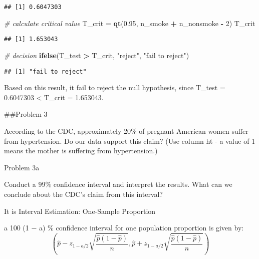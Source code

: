 \documentclass[
]{article}
\newenvironment{Shaded}{\begin{snugshade}}{\end{snugshade}}
\newcommand{\CommentTok}[1]{\textcolor[rgb]{0.56,0.35,0.01}{\textit{#1}}}
\newcommand{\DecValTok}[1]{\textcolor[rgb]{0.00,0.00,0.81}{#1}}
\newcommand{\FloatTok}[1]{\textcolor[rgb]{0.00,0.00,0.81}{#1}}
\newcommand{\FunctionTok}[1]{\textcolor[rgb]{0.13,0.29,0.53}{\textbf{#1}}}
\newcommand{\NormalTok}[1]{#1}
\newcommand{\OtherTok}[1]{\textcolor[rgb]{0.56,0.35,0.01}{#1}}
\newcommand{\SpecialCharTok}[1]{\textcolor[rgb]{0.81,0.36,0.00}{\textbf{#1}}}
\newcommand{\StringTok}[1]{\textcolor[rgb]{0.31,0.60,0.02}{#1}}
\begin{document}
\begin{verbatim}
## [1] 0.6047303
\end{verbatim}

\begin{Shaded}
\begin{Highlighting}[]
\CommentTok{\# calculate critical value  }
\NormalTok{T\_crit }\OtherTok{=} \FunctionTok{qt}\NormalTok{(}\FloatTok{0.95}\NormalTok{, n\_smoke }\SpecialCharTok{+}\NormalTok{ n\_nonsmoke }\SpecialCharTok{{-}} \DecValTok{2}\NormalTok{)}
\NormalTok{T\_crit}
\end{Highlighting}
\end{Shaded}

\begin{verbatim}
## [1] 1.653043
\end{verbatim}

\begin{Shaded}
\begin{Highlighting}[]
\CommentTok{\# decision}
\FunctionTok{ifelse}\NormalTok{(T\_test }\SpecialCharTok{\textgreater{}}\NormalTok{ T\_crit, }\StringTok{"reject"}\NormalTok{, }\StringTok{"fail to reject"}\NormalTok{)}
\end{Highlighting}
\end{Shaded}

\begin{verbatim}
## [1] "fail to reject"
\end{verbatim}

Based on this result, it fail to reject the null hypothesis, since
T\_test = 0.6047303 \textless{} T\_crit = 1.653043.

\#\#Problem 3

According to the CDC, approximately 20\% of pregnant American women
suffer from hypertension. Do our data support this claim? (Use column ht
- a value of 1 means the mother is suffering from hypertension.)

Problem 3a

Conduct a 99\% confidence interval and interpret the results. What can
we conclude about the CDC's claim from this interval?

It is Interval Estimation: One-Sample Proportion

a 100 (1 − a) \% confidence interval for one population proportion is
given by:
\[(\hat{p}-z_{1-a/2}\sqrt{\frac{\hat{p}(1-\hat{p})}{n}},\hat{p}+z_{1-a/2}\sqrt{\frac{\hat{p}(1-\hat{p})}{n}})\]
\end{document}
